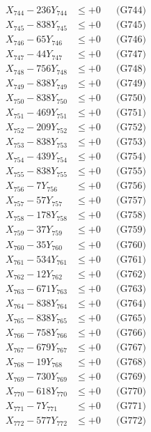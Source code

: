 \documentclass[a4paper,10pt]{article}
\begin{document}
{\begin{align}
X_{744} - 236Y_{744} &\leq +0 && \text{(G744)} \\
X_{745} - 838Y_{745} &\leq +0 && \text{(G745)} \\
X_{746} - 65Y_{746} &\leq +0 && \text{(G746)} \\
X_{747} - 44Y_{747} &\leq +0 && \text{(G747)} \\
X_{748} - 756Y_{748} &\leq +0 && \text{(G748)} \\
X_{749} - 838Y_{749} &\leq +0 && \text{(G749)} \\
X_{750} - 838Y_{750} &\leq +0 && \text{(G750)} \\
\allowbreak
X_{751} - 469Y_{751} &\leq +0 && \text{(G751)} \\
X_{752} - 209Y_{752} &\leq +0 && \text{(G752)} \\
X_{753} - 838Y_{753} &\leq +0 && \text{(G753)} \\
X_{754} - 439Y_{754} &\leq +0 && \text{(G754)} \\
X_{755} - 838Y_{755} &\leq +0 && \text{(G755)} \\
X_{756} - 7Y_{756} &\leq +0 && \text{(G756)} \\
X_{757} - 57Y_{757} &\leq +0 && \text{(G757)} \\
X_{758} - 178Y_{758} &\leq +0 && \text{(G758)} \\
X_{759} - 37Y_{759} &\leq +0 && \text{(G759)} \\
X_{760} - 35Y_{760} &\leq +0 && \text{(G760)} \\
\allowbreak
X_{761} - 534Y_{761} &\leq +0 && \text{(G761)} \\
X_{762} - 12Y_{762} &\leq +0 && \text{(G762)} \\
X_{763} - 671Y_{763} &\leq +0 && \text{(G763)} \\
X_{764} - 838Y_{764} &\leq +0 && \text{(G764)} \\
X_{765} - 838Y_{765} &\leq +0 && \text{(G765)} \\
X_{766} - 758Y_{766} &\leq +0 && \text{(G766)} \\
X_{767} - 679Y_{767} &\leq +0 && \text{(G767)} \\
X_{768} - 19Y_{768} &\leq +0 && \text{(G768)} \\
X_{769} - 730Y_{769} &\leq +0 && \text{(G769)} \\
X_{770} - 618Y_{770} &\leq +0 && \text{(G770)} \\
\allowbreak
X_{771} - 7Y_{771} &\leq +0 && \text{(G771)} \\
X_{772} - 577Y_{772} &\leq +0 && \text{(G772)} \\

\end{align}}
\end{document}
